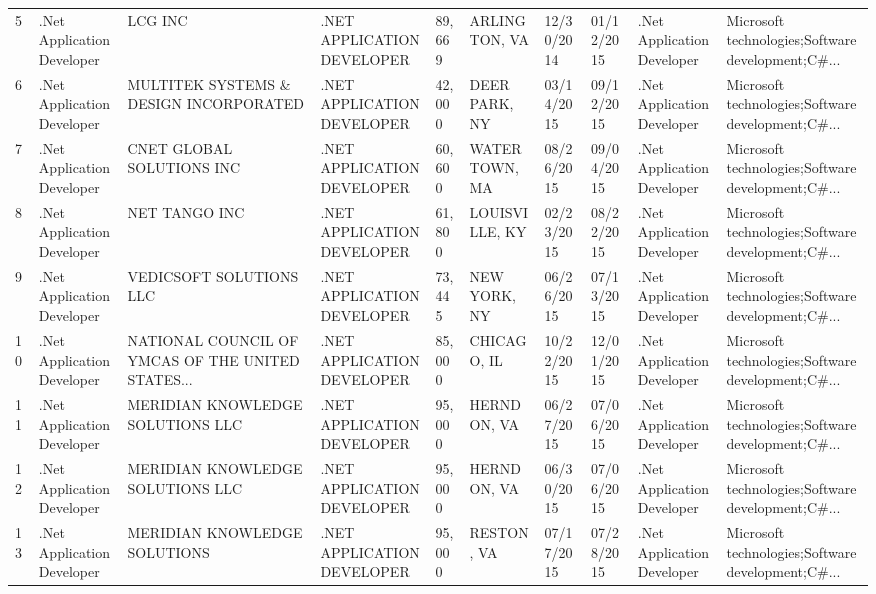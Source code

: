 \begin{table}[h!]
{\begin{tabular}{llllllllll}
	5  &  .Net Application Developer &                                            LCG INC &  .NET APPLICATION DEVELOPER &      89,669 &       ARLINGTON, VA &  12/30/2014 &  01/12/2015 &  .Net Application Developer &  Microsoft technologies;Software development;C\#... \\
	6  &  .Net Application Developer &             MULTITEK SYSTEMS \& DESIGN INCORPORATED &  .NET APPLICATION DEVELOPER &      42,000 &       DEER PARK, NY &  03/14/2015 &  09/12/2015 &  .Net Application Developer &  Microsoft technologies;Software development;C\#... \\
	7  &  .Net Application Developer &                          CNET GLOBAL SOLUTIONS INC &  .NET APPLICATION DEVELOPER &      60,600 &       WATERTOWN, MA &  08/26/2015 &  09/04/2015 &  .Net Application Developer &  Microsoft technologies;Software development;C\#... \\
	8  &  .Net Application Developer &                                      NET TANGO INC &  .NET APPLICATION DEVELOPER &      61,800 &      LOUISVILLE, KY &  02/23/2015 &  08/22/2015 &  .Net Application Developer &  Microsoft technologies;Software development;C\#... \\
	9  &  .Net Application Developer &                            VEDICSOFT SOLUTIONS LLC &  .NET APPLICATION DEVELOPER &      73,445 &        NEW YORK, NY &  06/26/2015 &  07/13/2015 &  .Net Application Developer &  Microsoft technologies;Software development;C\#... \\
	10 &  .Net Application Developer &  NATIONAL COUNCIL OF YMCAS OF THE UNITED STATES... &  .NET APPLICATION DEVELOPER &      85,000 &         CHICAGO, IL &  10/22/2015 &  12/01/2015 &  .Net Application Developer &  Microsoft technologies;Software development;C\#... \\
	11 &  .Net Application Developer &                   MERIDIAN KNOWLEDGE SOLUTIONS LLC &  .NET APPLICATION DEVELOPER &      95,000 &         HERNDON, VA &  06/27/2015 &  07/06/2015 &  .Net Application Developer &  Microsoft technologies;Software development;C\#... \\
	12 &  .Net Application Developer &                   MERIDIAN KNOWLEDGE SOLUTIONS LLC &  .NET APPLICATION DEVELOPER &      95,000 &         HERNDON, VA &  06/30/2015 &  07/06/2015 &  .Net Application Developer &  Microsoft technologies;Software development;C\#... \\
	13 &  .Net Application Developer &                       MERIDIAN KNOWLEDGE SOLUTIONS &  .NET APPLICATION DEVELOPER &      95,000 &          RESTON, VA &  07/17/2015 &  07/28/2015 &  .Net Application Developer &  Microsoft technologies;Software development;C\#... \\

\end{tabular}}
\end{table}
